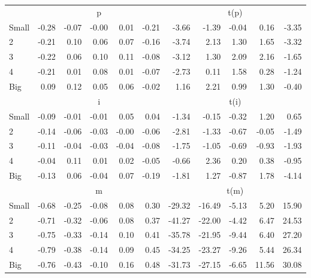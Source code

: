 \begin{table}[!ht]
\begin{tabular}{lrrrrrrrrrr}
      & \multicolumn{5}{c}{p} & \multicolumn{5}{c}{t(p)}
    
    \\
      \cmidrule(r){2-6} \cmidrule(r){7-11}

    Small   & -0.28  & -0.07  & -0.00  & 0.01  & -0.21  & -3.66  & -1.39  & -0.04  & 0.16  & -3.35  \\
         2  & -0.21  & 0.10  & 0.06  & 0.07  & -0.16  & -3.74  & 2.13  & 1.30  & 1.65  & -3.32  \\
         3  & -0.22  & 0.06  & 0.10  & 0.11  & -0.08  & -3.12  & 1.30  & 2.09  & 2.16  & -1.65  \\
         4  & -0.21  & 0.01  & 0.08  & 0.01  & -0.07  & -2.73  & 0.11  & 1.58  & 0.28  & -1.24  \\
    Big     & 0.09  & 0.12  & 0.05  & 0.06  & -0.02  & 1.16  & 2.21  & 0.99  & 1.30  & -0.40  \\

  
    
      & \multicolumn{5}{c}{i} & \multicolumn{5}{c}{t(i)}
    
    \\
      \cmidrule(r){2-6} \cmidrule(r){7-11}

    Small   & -0.09  & -0.01  & -0.01  & 0.05  & 0.04  & -1.34  & -0.15  & -0.32  & 1.20  & 0.65  \\
         2  & -0.14  & -0.06  & -0.03  & -0.00  & -0.06  & -2.81  & -1.33  & -0.67  & -0.05  & -1.49  \\
         3  & -0.11  & -0.04  & -0.03  & -0.04  & -0.08  & -1.75  & -1.05  & -0.69  & -0.93  & -1.93  \\
         4  & -0.04  & 0.11  & 0.01  & 0.02  & -0.05  & -0.66  & 2.36  & 0.20  & 0.38  & -0.95  \\
    Big     & -0.13  & 0.06  & -0.04  & 0.07  & -0.19  & -1.81  & 1.27  & -0.87  & 1.78  & -4.14  \\

  
    
      & \multicolumn{5}{c}{m} & \multicolumn{5}{c}{t(m)}
    
    \\
      \cmidrule(r){2-6} \cmidrule(r){7-11}

    Small   & -0.68  & -0.25  & -0.08  & 0.08  & 0.30  & -29.32  & -16.49  & -5.13  & 5.20  & 15.90  \\
         2  & -0.71  & -0.32  & -0.06  & 0.08  & 0.37  & -41.27  & -22.00  & -4.42  & 6.47  & 24.53  \\
         3  & -0.75  & -0.33  & -0.14  & 0.10  & 0.41  & -35.78  & -21.95  & -9.44  & 6.40  & 27.20  \\
         4  & -0.79  & -0.38  & -0.14  & 0.09  & 0.45  & -34.25  & -23.27  & -9.26  & 5.44  & 26.34  \\
    Big     & -0.76  & -0.43  & -0.10  & 0.16  & 0.48  & -31.73  & -27.15  & -6.65  & 11.56  & 30.08  \\

  

  \bottomrule
\end{tabular}
\label{tbl:25_Size_Prior_F17}
\end{table}